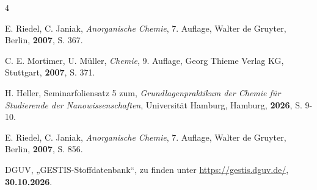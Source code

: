 \documentclass[
	a4paper,										%
	12pt,											%
	twoside,										%
	headsepline,								%
	footsepline,									%
	captions=tableheading,					%
]{scrartcl}
\begin{document}
\begin{thebibliography}{4}		%

						{E. Riedel, C. Janiak}, 
			\textit	{Anorganische Chemie}, 
						{7. Auflage}, 
						{Walter de Gruyter}, 
						{Berlin}, 
			\textbf	{2007}, 
			S.			{367}.

						{C. E. Mortimer, U. Müller}, 
			\textit	{Chemie}, 
						{9. Auflage}, 
						{Georg Thieme Verlag KG}, 
						{Stuttgart}, 
			\textbf	{2007}, 
			S.			{371}.

						{H. Heller, Seminarfoliensatz 5 zum}, 
			\textit	{Grundlagenpraktikum der Chemie für Studierende der Nanowissenschaften},  
						{Universität Hamburg}, 
						{Hamburg}, 
			\textbf	{2026}, 
			S.			{9-10}.

						{E. Riedel, C. Janiak}, 
			\textit	{Anorganische Chemie}, 
						{7. Auflage}, 
						{Walter de Gruyter}, 
						{Berlin}, 
			\textbf	{2007}, 
			S.			{856}.
	
						{DGUV}, 
						„{GESTIS-Stoffdatenbank}“, zu finden unter 
			\url		{https://gestis.dguv.de/}, 
			\textbf	{30.10.2026}.


\end{thebibliography}
\end{document}
